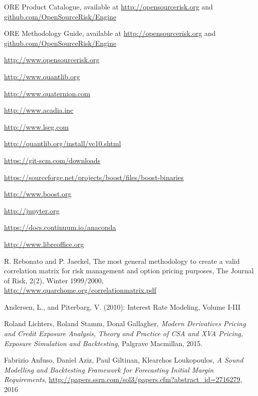 \documentclass[12pt, a4paper]{article}
\begin{document}
\begin{thebibliography}{*}

 ORE Product Catalogue, available at \url{http://opensourcerisk.org} and \url{github.com/OpenSourceRisk/Engine}

 ORE Methodology Guide, available at \url{http://opensourcerisk.org} and \url{github.com/OpenSourceRisk/Engine}
  
 \url{http://www.opensourcerisk.org}

 \url{http://www.quantlib.org}
 
 \url{http://www.quaternion.com}

 \url{http://www.acadia.inc}

 \url{http://www.lseg.com}
  
 \url{http://quantlib.org/install/vc10.shtml}

 \url{https://git-scm.com/downloads}

 \url{https://sourceforge.net/projects/boost/files/boost-binaries}

 \url{http://www.boost.org}

 \url{http://jupyter.org}

 \url{https://docs.continuum.io/anaconda}

 \url{http://www.libreoffice.org}

 R. Rebonato and P. Jaeckel, The most general methodology to create a valid correlation matrix for
  risk management and option pricing purposes, The Journal of Risk, 2(2), Winter 1999/2000,
  \url{http://www.quarchome.org/correlationmatrix.pdf}

 Andersen, L., and Piterbarg, V. (2010): Interest Rate Modeling, Volume I-III
  
 Roland Lichters, Roland Stamm, Donal Gallagher, {\em Modern Derivatives Pricing and Credit Exposure
    Analysis, Theory and Practice of CSA and XVA Pricing, Exposure Simulation and Backtesting}, Palgrave Macmillan,
  2015.

 Fabrizio Anfuso, Daniel Aziz, Paul Giltinan, Klearchos Loukopoulos, {\em A Sound Modelling and
    Backtesting Framework for Forecasting Initial Margin Requirements},
  \url{http://papers.ssrn.com/sol3/papers.cfm?abstract_id=2716279}, 2016


\end{thebibliography}
\end{document}
